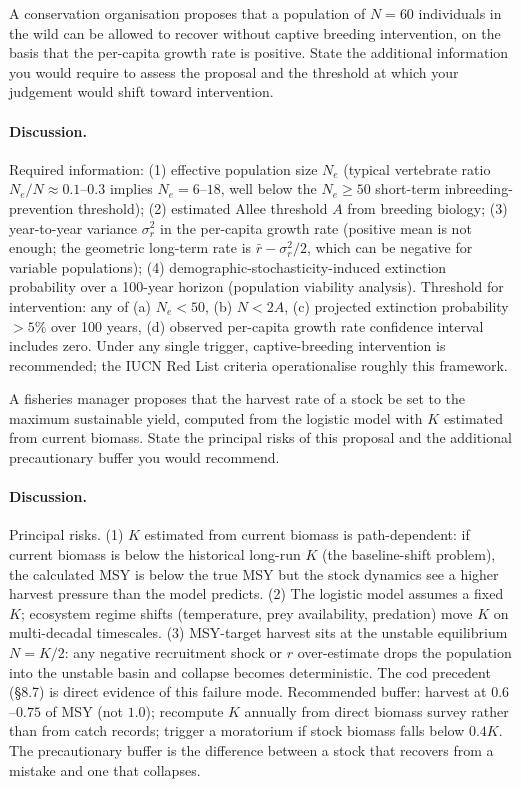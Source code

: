 \begin{exercise}
A conservation organisation proposes that a population of
$N = 60$ individuals in the wild can be allowed to recover without
captive breeding intervention, on the basis that the per-capita
growth rate is positive. State the additional information you
would require to assess the proposal and the threshold at which
your judgement would shift toward intervention.

\paragraph{Discussion.} Required information: (1) effective
population size $N_e$ (typical vertebrate ratio $N_e/N \approx
0.1$--$0.3$ implies $N_e = 6$--$18$, well below the
$N_e \geq 50$ short-term inbreeding-prevention threshold); (2)
estimated Allee threshold $A$ from breeding biology; (3)
year-to-year variance $\sigma_r^2$ in the per-capita growth rate
(positive mean is not enough; the geometric long-term rate is
$\bar r - \sigma_r^2/2$, which can be negative for variable
populations); (4) demographic-stochasticity-induced extinction
probability over a 100-year horizon (population viability
analysis). Threshold for intervention: any of (a) $N_e < 50$, (b)
$N < 2A$, (c) projected extinction probability $> 5\%$ over 100
years, (d) observed per-capita growth rate confidence interval
includes zero. Under any single trigger, captive-breeding
intervention is recommended; the IUCN Red List criteria operationalise
roughly this framework.
\end{exercise}

\begin{exercise}
A fisheries manager proposes that the harvest rate of a stock be
set to the maximum sustainable yield, computed from the logistic
model with $K$ estimated from current biomass. State the principal
risks of this proposal and the additional precautionary buffer you
would recommend.

\paragraph{Discussion.} Principal risks. (1) $K$ estimated from
current biomass is path-dependent: if current biomass is below
the historical long-run $K$ (the baseline-shift problem), the
calculated MSY is below the true MSY but the stock dynamics see
a higher harvest pressure than the model predicts. (2) The
logistic model assumes a fixed $K$; ecosystem regime shifts
(temperature, prey availability, predation) move $K$ on
multi-decadal timescales. (3) MSY-target harvest sits at the
unstable equilibrium $N = K/2$: any negative recruitment shock or
$r$ over-estimate drops the population into the unstable basin
and collapse becomes deterministic. The cod precedent (§8.7) is
direct evidence of this failure mode. Recommended buffer: harvest
at $0.6$--$0.75$ of MSY (not $1.0$); recompute $K$ annually from
direct biomass survey rather than from catch records; trigger a
moratorium if stock biomass falls below $0.4 K$. The precautionary
buffer is the difference between a stock that recovers from a
mistake and one that collapses.
\end{exercise}

